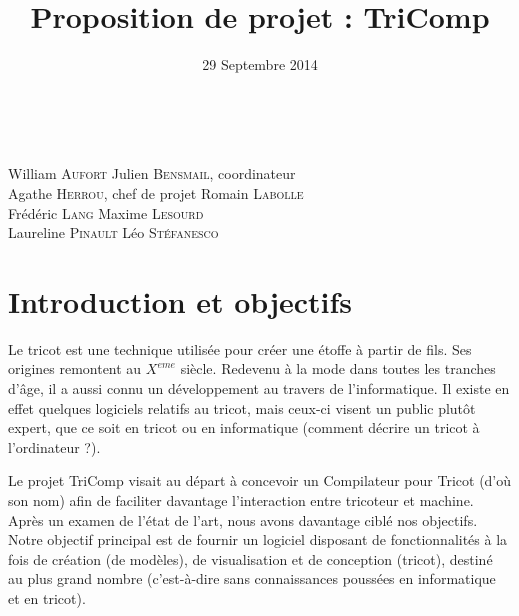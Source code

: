 \documentclass{article}
\title{Proposition de projet : TriComp}
\author{}
\date{29 Septembre 2014}
\begin{document}
\makeatletter %
  \begin{titlepage}
    \begin{center}
       {\LARGE \@title} \\
       \vspace{1cm}
       {\large \@date}
       \vspace{2cm}
    \end{center}
       {\large
       William \textsc{Aufort} \hfill Julien \textsc{Bensmail}, coordinateur\\
       Agathe \textsc{Herrou}, chef de projet  \hfill Romain \textsc{Labolle} \\
       Frédéric \textsc{Lang} \hfill Maxime \textsc{Lesourd} \\
       Laureline \textsc{Pinault} \hfill Léo \textsc{Stéfanesco}}
  \tableofcontents
  \end{titlepage}
\makeatother

\pagebreak

%



\section{Introduction et objectifs}

Le tricot est une technique utilisée pour créer une étoffe à partir de fils. Ses origines remontent au $X^{eme}$ siècle.
Redevenu à la mode dans toutes les tranches d'âge, il a aussi connu un développement au travers de l'informatique. Il existe en effet
quelques logiciels relatifs au tricot, mais ceux-ci visent un public plutôt expert, que ce soit en tricot ou en informatique (comment
décrire un tricot à l'ordinateur ?).

Le projet TriComp visait au départ à concevoir un Compilateur pour Tricot (d'où son nom) afin de faciliter davantage l'interaction entre
tricoteur et machine. Après un examen de l'état de l'art, nous avons davantage ciblé nos objectifs. Notre objectif principal est de
fournir un logiciel disposant de fonctionnalités à la fois de création (de modèles), de visualisation et de conception (tricot),
destiné au plus grand nombre (c'est-à-dire sans connaissances poussées en informatique et en tricot).
\end{document}
